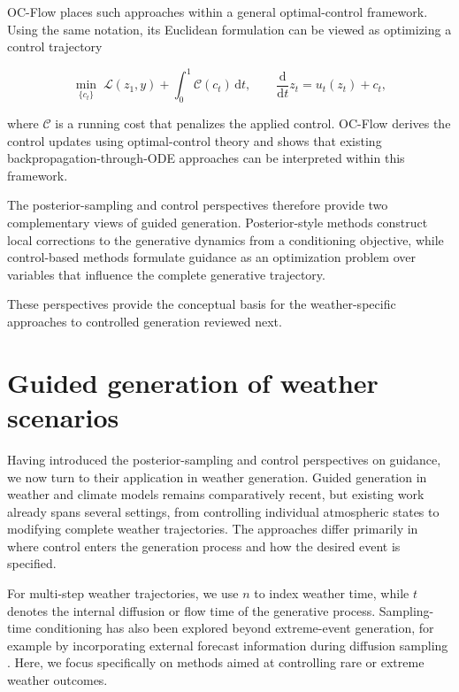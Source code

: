 OC-Flow \parencite{wang2025ocflow} places such approaches within a general
optimal-control framework.
Using the same notation, its Euclidean formulation can be viewed as optimizing
a control trajectory

\begin{equation}
    \min_{\{c_t\}}
    \;
    \mathcal{L}(z_1,y)
    +
    \int_0^1
    \mathcal{C}(c_t)\,
    \mathrm{d}t,
    \qquad
    \frac{\mathrm{d}}{\mathrm{d}t}z_t
    =
    u_t(z_t)+c_t,
    \label{eq:ocflow-control}
\end{equation}

where $\mathcal{C}$ is a running cost that penalizes the applied control.
OC-Flow derives the control updates using optimal-control theory and shows that
existing backpropagation-through-ODE approaches can be interpreted within this
framework.

The posterior-sampling and control perspectives therefore provide two
complementary views of guided generation.
Posterior-style methods construct local corrections to the generative dynamics
from a conditioning objective, while control-based methods formulate guidance
as an optimization problem over variables that influence the complete
generative trajectory.

These perspectives provide the conceptual basis for the weather-specific
approaches to controlled generation reviewed next.

\section{Guided generation of weather scenarios}
\label{sec:controlled-weather-generation}

Having introduced the posterior-sampling and control perspectives on guidance,
we now turn to their application in weather generation. Guided generation in
weather and climate models remains comparatively recent, but existing work
already spans several settings, from controlling individual atmospheric states
to modifying complete weather trajectories. The approaches differ primarily in
where control enters the generation process and how the desired event is
specified.

For multi-step weather trajectories, we use $n$ to index weather time, while
$t$ denotes the internal diffusion or flow time of the generative process.
Sampling-time conditioning has also been explored beyond extreme-event
generation, for example by incorporating external forecast information during
diffusion sampling \parencite{hua2024weather}. Here, we focus specifically on
methods aimed at controlling rare or extreme weather outcomes.

